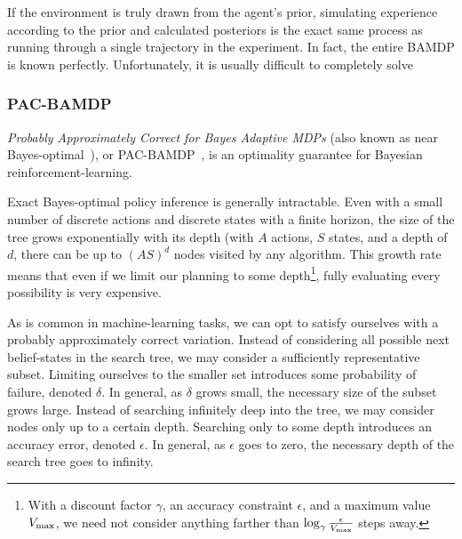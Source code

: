 If the environment is truly drawn from the agent's prior, simulating experience according to the prior and calculated posteriors is the exact same process as running through a single trajectory in the experiment. In fact, the entire BAMDP is known perfectly. Unfortunately, it is usually difficult to completely solve

\subsubsection{PAC-BAMDP}

\emph{Probably Approximately Correct for Bayes Adaptive MDPs} (also known as near Bayes-optimal~\cite{kolter09}), or PAC-BAMDP~\cite{araya2012near}, is an optimality guarantee for Bayesian reinforcement-learning.

Exact Bayes-optimal policy inference is generally intractable. Even with a small number of discrete actions and discrete states with a finite horizon, the size of the tree grows exponentially with its depth (with $A$ actions, $S$ states, and a depth of $d$, there can be up to $(A S)^d$ nodes visited by any algorithm. This growth rate means that even if we limit our planning to some depth\footnote{With a discount factor $\gamma$, an accuracy constraint $\epsilon$, and a maximum value $V_{\rm max}$, we need not consider anything farther than $\log_\gamma \frac \epsilon {V_{\rm max}}$ steps away. }, fully evaluating every possibility is very expensive.

As is common in machine-learning tasks, we can opt to satisfy ourselves with a probably approximately correct variation. Instead of considering all possible next belief-states in the search tree, we may consider a sufficiently representative subset. Limiting ourselves to the smaller set introduces some probability of failure, denoted $\delta$. In general, as $\delta$ grows small, the necessary size of the subset grows large. Instead of searching infinitely deep into the tree, we may consider nodes only up to a certain depth. Searching only to some depth introduces an accuracy error, denoted $\epsilon$. In general, as $\epsilon$ goes to zero, the necessary depth of the search tree goes to infinity.

